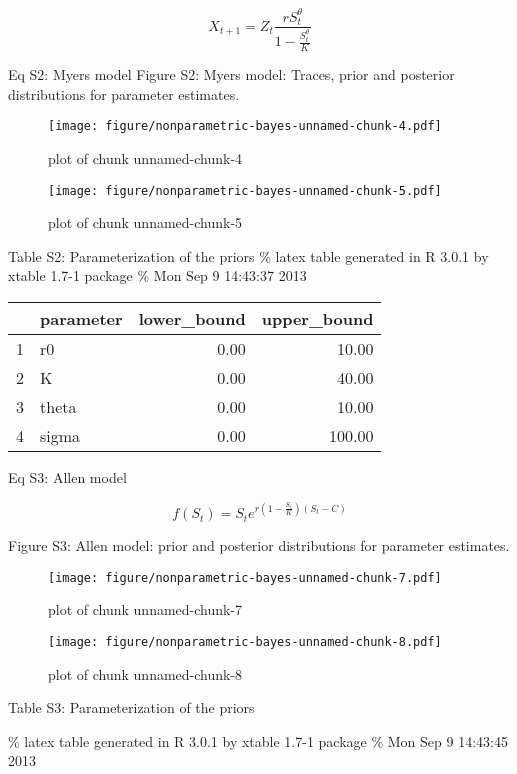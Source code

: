 \documentclass[author-year, review]{elsarticle} %
\makeatletter
\def\maxwidth{\ifdim\Gin@nat@width>\linewidth\linewidth
\else\Gin@nat@width\fi}
\let\Oldincludegraphics\includegraphics
\renewcommand{\includegraphics}[1]{\Oldincludegraphics[width=\maxwidth]{#1}}
\makeatother
\begin{document}
\[ X_{t+1} = Z_t \frac{r S_t^{\theta}}{1 - \frac{S_t^\theta}{K}} \]

Eq S2: Myers model Figure S2: Myers model: Traces, prior and posterior
distributions for parameter estimates.

\begin{figure}[htbp]
\centering
\texttt{[image: figure/nonparametric-bayes-unnamed-chunk-4.pdf]}
\caption{plot of chunk unnamed-chunk-4}
\end{figure}

\begin{figure}[htbp]
\centering
\texttt{[image: figure/nonparametric-bayes-unnamed-chunk-5.pdf]}
\caption{plot of chunk unnamed-chunk-5}
\end{figure}

Table S2: Parameterization of the priors \% latex table generated in R
3.0.1 by xtable 1.7-1 package \% Mon Sep 9 14:43:37 2013

\begin{table}[ht]
\centering
\begin{tabular}{rlrr}
  \hline
 & parameter & lower\_bound & upper\_bound \\ 
  \hline
1 & r0 & 0.00 & 10.00 \\ 
  2 & K & 0.00 & 40.00 \\ 
  3 & theta & 0.00 & 10.00 \\ 
  4 & sigma & 0.00 & 100.00 \\ 
   \hline
\end{tabular}
\end{table}

Eq S3: Allen model

\[f(S_t) = S_t e^{r \left(1 - \frac{S_t}{K}\right)\left(S_t - C\right)} \]

Figure S3: Allen model: prior and posterior distributions for parameter
estimates.

\begin{figure}[htbp]
\centering
\texttt{[image: figure/nonparametric-bayes-unnamed-chunk-7.pdf]}
\caption{plot of chunk unnamed-chunk-7}
\end{figure}

\begin{figure}[htbp]
\centering
\texttt{[image: figure/nonparametric-bayes-unnamed-chunk-8.pdf]}
\caption{plot of chunk unnamed-chunk-8}
\end{figure}

Table S3: Parameterization of the priors

\% latex table generated in R 3.0.1 by xtable 1.7-1 package \% Mon Sep 9
14:43:45 2013
\end{document}
